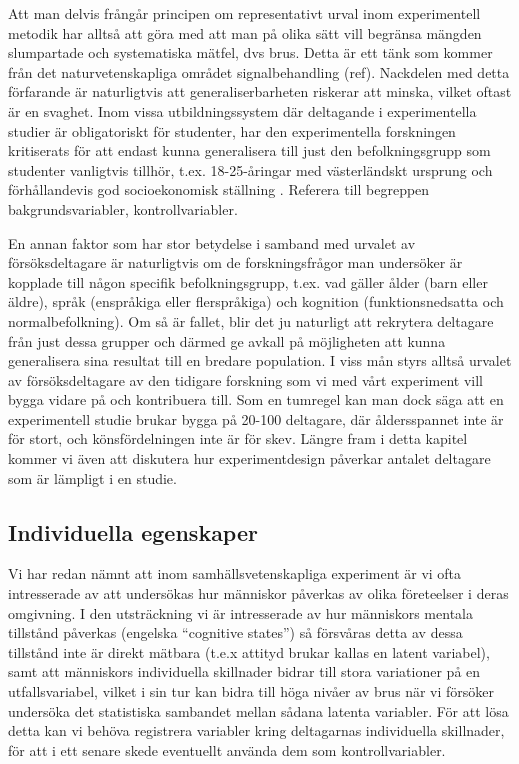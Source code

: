 \documentclass[
]{book}
\begin{document}
Att man delvis frångår principen om representativt urval inom experimentell metodik har alltså att göra med att man på olika sätt vill begränsa mängden slumpartade och systematiska mätfel, dvs brus. Detta är ett tänk som kommer från det naturvetenskapliga området signalbehandling (ref). Nackdelen med detta förfarande är naturligtvis att generaliserbarheten riskerar att minska, vilket oftast är en svaghet. Inom vissa utbildningssystem där deltagande i experimentella studier är obligatoriskt för studenter, har den experimentella forskningen kritiserats för att endast kunna generalisera till just den befolkningsgrupp som studenter vanligtvis tillhör, t.ex. 18-25-åringar med västerländskt ursprung och förhållandevis god socioekonomisk ställning \citep{henrich2010weirdest}. Referera till begreppen bakgrundsvariabler, kontrollvariabler.

En annan faktor som har stor betydelse i samband med urvalet av försöksdeltagare är naturligtvis om de forskningsfrågor man undersöker är kopplade till någon specifik befolkningsgrupp, t.ex. vad gäller ålder (barn eller äldre), språk (enspråkiga eller flerspråkiga) och kognition (funktionsnedsatta och normalbefolkning). Om så är fallet, blir det ju naturligt att rekrytera deltagare från just dessa grupper och därmed ge avkall på möjligheten att kunna generalisera sina resultat till en bredare population. I viss mån styrs alltså urvalet av försöksdeltagare av den tidigare forskning som vi med vårt experiment vill bygga vidare på och kontribuera till. Som en tumregel kan man dock säga att en experimentell studie brukar bygga på 20-100 deltagare, där åldersspannet inte är för stort, och könsfördelningen inte är för skev. Längre fram i detta kapitel kommer vi även att diskutera hur experimentdesign påverkar antalet deltagare som är lämpligt i en studie.

\hypertarget{sub07.2.3}{%
\subsection{Individuella egenskaper}\label{sub07.2.3}}

Vi har redan nämnt att inom samhällsvetenskapliga experiment är vi ofta intresserade av att undersökas hur människor påverkas av olika företeelser i deras omgivning. I den utsträckning vi är intresserade av hur människors mentala tillstånd påverkas (engelska ``cognitive states'') så försvåras detta av dessa tillstånd inte är direkt mätbara (t.e.x attityd brukar kallas en latent variabel), samt att människors individuella skillnader bidrar till stora variationer på en utfallsvariabel, vilket i sin tur kan bidra till höga nivåer av brus när vi försöker undersöka det statistiska sambandet mellan sådana latenta variabler. För att lösa detta kan vi behöva registrera variabler kring deltagarnas individuella skillnader, för att i ett senare skede eventuellt använda dem som kontrollvariabler.
\end{document}
